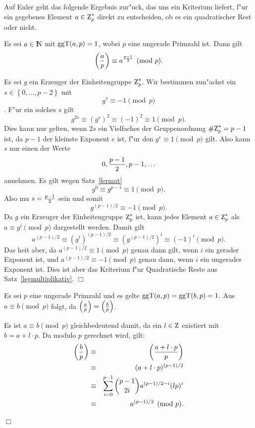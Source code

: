 Auf Euler geht das folgende Ergebnis zur"uck, das uns ein
Kriterium liefert, f"ur ein gegebenes Element $a\in\einheit{p}$ direkt
zu entscheiden, ob es ein quadratischer Rest oder nicht.
\begin{satz} 
Es sei $a\in\N$ mit $\mbox{ggT}(a,p)=1$, wobei $p$ eine ungerade Primzahl
ist. Dann gilt
$$ \left(\frac{a}{p}\right) \equiv a^{\frac{p-1}{2}} \pmod{p}. \label{eulerkrit} $$
\end{satz}

\beweis 
Es sei $g$ ein Erzeuger der Einheitengruppe $\einheit{p}$. Wir
bestimmen zun"achst ein $s\in\left\{0,\ldots,p-2\right\}$ mit 
$$ g^s \equiv -1 \pmod{p} $$. 
F"ur ein solches $s$ gilt 
$$ g^{2s} \equiv (g^s)^2 \equiv (-1)^2 \equiv 1 \pmod{p}. $$ 
Dies kann nur gelten, wenn $2s$ ein Vielfaches
der Gruppenordnung $\#\einheit{p} = p-1$ ist, da $p-1$ der kleinste
Exponent $e$ ist, f"ur den $g^e \equiv 1 \pmod{p}$ gilt. Also kann $s$
nur einen der Werte
$$ 0,{p-1 \over 2}, p-1,\ldots $$
annehmen. Es gilt wegen Satz~\ref{fermat}
$$ g^0 \equiv g^{p-1} \equiv 1 \pmod{p}. $$
Also mu\3 $s={p-1 \over 2}$ sein und somit 
$$ g^{(p-1)/2} \equiv -1 \pmod{p}. $$ 
Da $g$ ein Erzeuger der Einheitengruppe $\einheit{p}$ ist, kann jedes Element
$a\in\einheit{p}$ als $a \equiv g^i \pmod{p}$ dargestellt
werden. Damit gilt
$$ a^{(p-1)/2} \equiv (g^i)^{(p-1)/2} \equiv
\left(g^{(p-1)/2}\right)^i \equiv (-1)^i \pmod{p}. $$ Das hei\3t aber,
da\3 $a^{(p-1)/2} \equiv 1 \pmod{p}$ genau dann gilt, wenn $i$ ein
gerader Exponent ist, und $a^{(p-1)/2} \equiv -1 \pmod{p}$ genau dann,
wenn $i$ ein ungerader Exponent ist. Dies ist aber das Kriterium f"ur Quadratische
Reste aus Satz~\ref{legmultiplikativ}. \hfill $\Box$

\begin{kor} \label{modulo}
Es sei $p$ eine ungerade Primzahl und es gelte
$\mbox{ggT}(a,p)=\mbox{ggT}(b,p)=1.$ Aus $a \equiv b \pmod{p}$ folgt, da\3
$\left(\frac{a}{p}\right) = \left(\frac{b}{p}\right)$.
\end{kor}

\beweis 
Es ist $a \equiv b \pmod{p}$ gleichbedeutend damit, da\3 ein $l\in \Z$
existiert mit $b=a+l\cdot p$. Da modulo $p$ gerechnet wird, gilt:
\begin{eqnarray*}
  \left(\frac{b}{p}\right) & \equiv & \left(\frac{a+l\cdot p}{p}\right) \\
             & \equiv & (a+l\cdot p)^{(p-1)/2} \\
             & \equiv & \sum_{i=0}^{p-1} {p-1 \choose 2i} a^{(p-1)/2-i}(lp)^i \\
             & \equiv & a^{(p-1)/2} \pmod{p}.
\end{eqnarray*}
\rule{0pt}{0pt}\hfill $\Box$
                     
